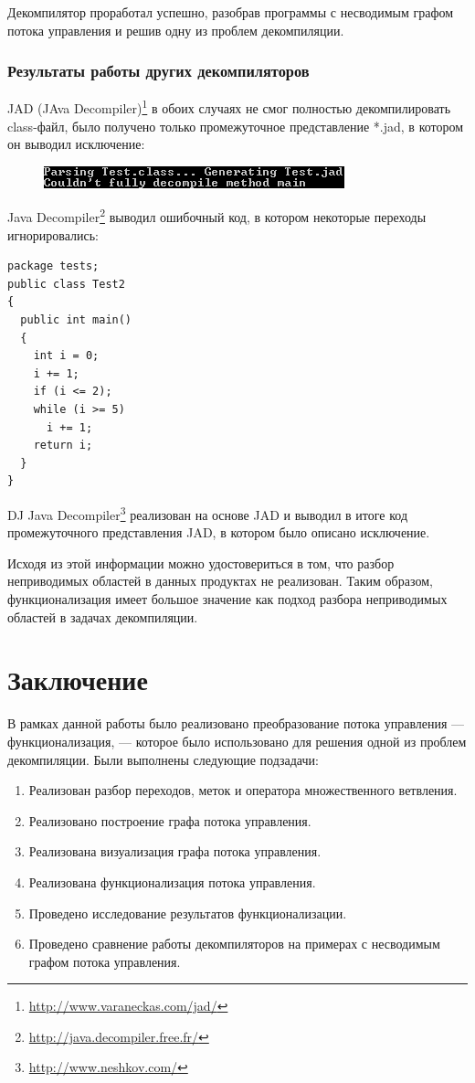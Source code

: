 \documentclass[14pt]{extarticle}
\begin{document}
  
Декомпилятор проработал успешно, разобрав программы с несводимым графом потока управления и решив одну из проблем декомпиляции.  

\newpage  
\subsubsection*{Результаты работы других декомпиляторов}

JAD (JAva Decompiler)\footnote{\url{http://www.varaneckas.com/jad/}} в обоих случаях не смог полностью декомпилировать class-файл, было получено только промежуточное представление *.jad, в котором он выводил исключение: 
\begin{figure}[H]
\begin{center}
\includegraphics[scale=1]{out.png}
\end{center} 
\end{figure}
Java Decompiler\footnote{\url{http://java.decompiler.free.fr/}} выводил ошибочный код, в котором некоторые переходы игнорировались:

\begin{lstlisting}[frame=single]
package tests;
public class Test2
{
  public int main()
  {
    int i = 0;
    i += 1;
    if (i <= 2);
    while (i >= 5)
      i += 1;
    return i;
  }
}
\end{lstlisting}

DJ Java Decompiler\footnote{\url{http://www.neshkov.com/}} реализован на основе JAD и выводил в итоге код промежуточного представления JAD, в котором было описано исключение.  

Исходя из этой информации можно удостовериться в том, что разбор неприводимых областей в данных продуктах не реализован. Таким образом, функционализация имеет большое значение как подход разбора неприводимых областей в задачах декомпиляции.

\newpage
\section*{Заключение}

В рамках данной работы было реализовано преобразование потока управления --- функционализация, --- которое было использовано для решения одной из проблем декомпиляции. Были выполнены следующие подзадачи:
\begin{enumerate}
  		\item Реализован разбор переходов, меток и оператора множественного ветвления.
  		\item Реализовано построение графа потока управления.
  		\item Реализована визуализация графа потока управления.
  		\item Реализована функционализация потока управления.
		\item Проведено исследование результатов функционализации.
		\item Проведено сравнение работы декомпиляторов на примерах с несводимым графом потока управления.
\end{enumerate}
\pagebreak
\end{document}
